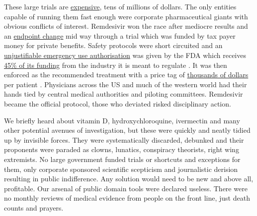\documentclass[11pt,a4paper,notitlepage]{report}
\begin{document}
These large trials are \href{https://www.sofpromed.com/what-is-the-cost-of-a-clinical-trial}{expensive}, tens of millions of dollars. The only entities capable of running them  fast enough were corporate pharmaceutical giants with obvious conflicts of interest. Remdesivir won the race after mediocre results and an \href{https://blogs.bmj.com/bmj/2020/06/10/remdesivir-in-the-plague-year-observations-of-the-most-remarkable-occurences/}{endpoint change} mid way through a trial \cite{bmj10062020} which was funded by tax payer money for private benefits. Safety protocols were short circuited and an \href{https://www.science.org/content/article/very-very-bad-look-remdesivir-first-fda-approved-covid-19-drug}{unjustifiable emergency use authorisation} was given by the FDA \cite{science28102020} which receives \href{https://today.uconn.edu/2021/05/why-is-the-fda-funded-in-part-by-the-companies-it-regulates-2/#}{45\% of its funding} from the industry it is meant to regulate \cite{uconn21052021}. It was then enforced as the recommended treatment with a price tag of \href{https://www.ajmc.com/view/gilead-sciences-sets-us-price-for-covid19-drug-at-2340-to-3120-based-on-insurance}{thousands of dollars} per patient \cite{ajcm20062020}. Physicians across the US and much of the western world had their hands tied by central medical authorities and piloting committees. Remdesivir became the official protocol, those who deviated risked disciplinary action.

We briefly heard about vitamin D, hydroxychloroquine, ivermectin and many other potential avenues of investigation, but these were quickly and neatly tidied up by invisible forces. They were systematically discarded, debunked and their proponents were paraded as clowns, lunatics, conspiracy theorists, right wing extremists. No large government funded trials or shortcuts and exceptions for them, only corporate sponsored scientific scepticism and journalistic derision resulting in public indifference. Any solution would need to be new and above all, profitable. Our arsenal of public domain tools were declared useless. There were no monthly reviews of medical evidence from people on the front line, just death counts and prayers.
\end{document}
